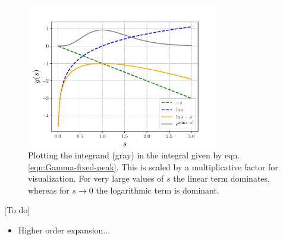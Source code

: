 \begin{figure}[!h]
	\centering
	\includegraphics[width=0.75\textwidth]{./plots/pdf/strogatz-wk04.pdf}
	\caption{Plotting the integrand (gray) in the integral given by eqn. \ref{eqn:Gamma-fixed-peak}. This is scaled by a multiplicative factor for visualization. For very large values of $s$ the linear term dominates, whereas for $s \rightarrow 0$ the logarithmic term is dominant.}
	\label{fig:strogatz-wk04}
\end{figure}

{\color{red}[To do]}
\begin{itemize}
	\item Higher order expansion... 
\end{itemize}


